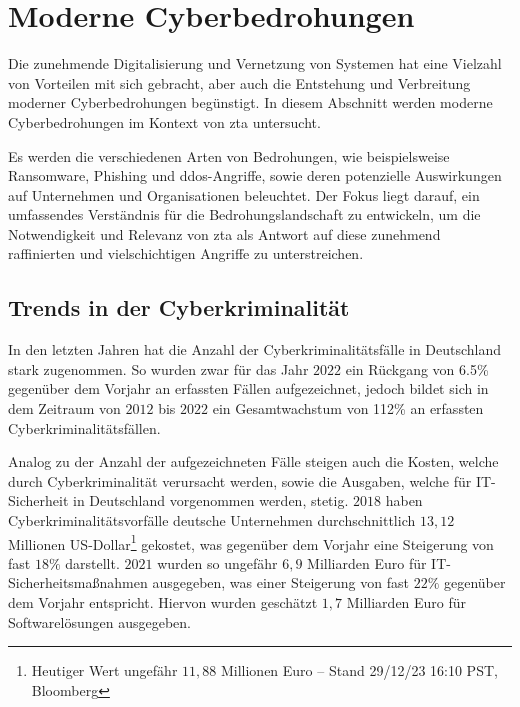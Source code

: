 \newpage


\section{Moderne Cyberbedrohungen}\label{sec:moderne-cyberbedrohungen}
Die zunehmende Digitalisierung und Vernetzung von Systemen hat eine Vielzahl von Vorteilen mit sich gebracht, aber auch die Entstehung und Verbreitung moderner Cyberbedrohungen begünstigt.
In diesem Abschnitt werden moderne Cyberbedrohungen im Kontext von \ac{zta} untersucht.

Es werden die verschiedenen Arten von Bedrohungen, wie beispielsweise Ransomware, Phishing und \ac{ddos}-Angriffe, sowie deren potenzielle Auswirkungen auf Unternehmen und Organisationen beleuchtet.
Der Fokus liegt darauf, ein umfassendes Verständnis für die Bedrohungslandschaft zu entwickeln, um die Notwendigkeit und Relevanz von \ac{zta} als Antwort auf diese zunehmend raffinierten und vielschichtigen Angriffe zu unterstreichen.

\subsection{Trends in der Cyberkriminalität}\label{subsec:trends-und-entwicklungen-in-der-cyberkriminalitat}
In den letzten Jahren hat die Anzahl der Cyberkriminalitätsfälle in Deutschland stark zugenommen.
So wurden zwar für das Jahr $2022$ ein Rückgang von 6.5\% gegenüber dem Vorjahr an erfassten Fällen aufgezeichnet, jedoch bildet sich in dem Zeitraum von $2012$ bis $2022$ ein Gesamtwachstum von 112\% an erfassten Cyberkriminalitätsfällen\autocite[\vglf][]{bka-cyberkriminalitaet}.

Analog zu der Anzahl der aufgezeichneten Fälle steigen auch die Kosten, welche durch Cyberkriminalität verursacht werden, sowie die Ausgaben, welche für IT-Sicherheit in Deutschland vorgenommen werden, stetig.
$2018$ haben Cyberkriminalitätsvorfälle deutsche Unternehmen durchschnittlich $13,12$ Millionen US-Dollar\footnote{Heutiger Wert ungefähr $11,88$ Millionen Euro – Stand 29/12/23 16:10 PST, Bloomberg} gekostet, was gegenüber dem Vorjahr eine Steigerung von fast $18\%$ darstellt\autocite[\vglf][]{accenture-cyberkrime-kosten}.
$2021$ wurden so ungefähr $6,9$ Milliarden Euro für IT-Sicherheitsmaßnahmen ausgegeben, was einer Steigerung von fast $22\%$ gegenüber dem Vorjahr entspricht\autocite[\vglf][]{bitkom-itsicherheit}.
Hiervon wurden geschätzt $1,7$ Milliarden Euro für Softwarelösungen ausgegeben\autocite[\vglf][]{bitkom-itsicherheit-segment}.

